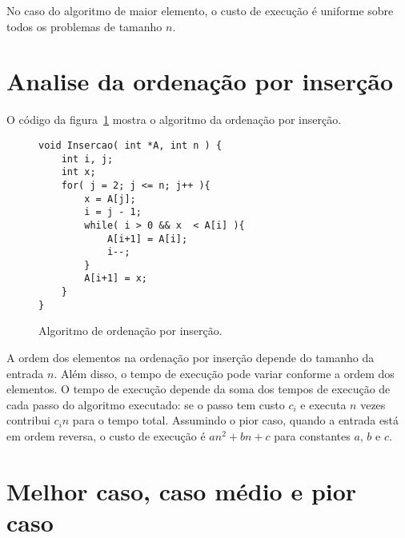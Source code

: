 No caso do algoritmo de maior elemento, o custo de execução é uniforme sobre todos os problemas 
de tamanho $n$.

\section{Analise da ordenação por inserção}
\label{aula02:sec:insertion}

O código da figura~\ref{aula02:algo:insertion} mostra o algoritmo da ordenação
por inserção.
%
\begin{figure}[!htb]
\centering
\begin{framed}
\begin{lstlisting}
void Insercao( int *A, int n ) {
	int i, j;
	int x;
	for( j = 2; j <= n; j++ ){
		x = A[j];
		i = j - 1;
		while( i > 0 && x  < A[i] ){
			A[i+1] = A[i];
			i--;
		}
		A[i+1] = x;
	}
}
\end{lstlisting}
\end{framed}
\caption{Algoritmo de ordenação por inserção.}
\label{aula02:algo:insertion}
\end{figure}
%

A ordem dos elementos na ordenação por inserção depende do tamanho da entrada $n$. 
Além disso, o tempo de execução pode variar conforme a ordem dos elementos.
%
O tempo de execução depende da soma dos tempos de execução de cada passo do algoritmo
executado: se o passo tem custo $c_i$ e executa $n$ vezes contribui $c_i n$ para o tempo
total.
Assumindo o pior caso, quando a entrada está em ordem reversa, o custo de execução é 
$an^2 + bn +c$ para constantes $a$, $b$ e $c$.


\section{Melhor caso, caso médio e pior caso}

